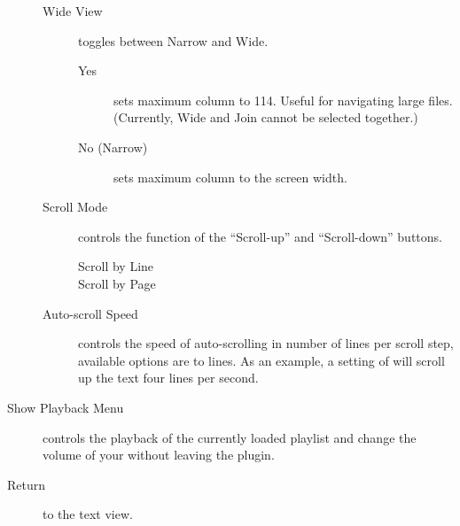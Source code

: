 \begin{description}
\begin{description}
\begin{description}
        \end{description}
    \item[Wide View] toggles between Narrow and Wide.
        \begin{description}
            \item[Yes] sets maximum column to 114. Useful for navigating large files.
            (Currently, Wide and Join cannot be selected together.)
            \item[No (Narrow)] sets maximum column to the screen width.
        \end{description}
    \item[Scroll Mode] controls the function of the ``Scroll-up'' and
    ``Scroll-down'' buttons.
        \begin{description}
            \item[Scroll by Line]
            \item[Scroll by Page]
        \end{description}
    \item[Auto-scroll Speed]
    controls the speed of auto-scrolling in number of lines per scroll step,
    available options are  to  lines. As an example,
    a setting of  will scroll up the text four lines per second.
    \end{description}

\item[Show Playback Menu] controls the playback of the currently loaded playlist
and change the volume of your \dap{} without leaving the plugin.
\item[Return] to the text view.
\end{description}

